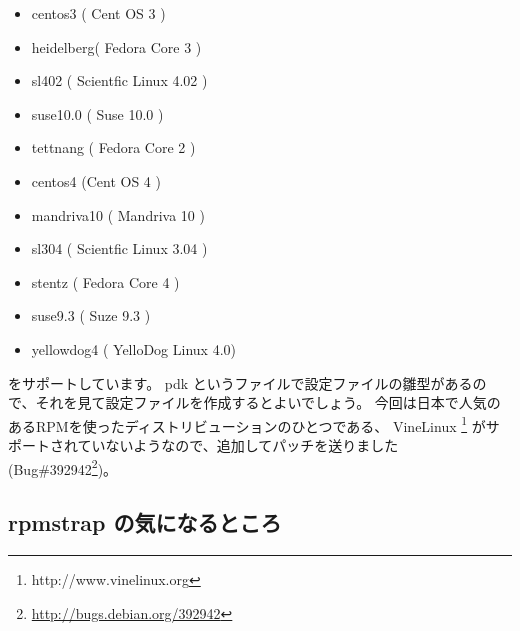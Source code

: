 \documentclass[mingoth,a4paper]{jsarticle}
\newcommand{\debianbug}[1]{Bug\##1\footnote{\url{http://bugs.debian.org/#1}}}
\begin{document}
\begin{itemize}
\item centos3 ( Cent OS 3 )
\item heidelberg( Fedora Core 3 )  
\item sl402 ( Scientfic Linux 4.02 )       
\item suse10.0  ( Suse 10.0 )
\item tettnang ( Fedora Core 2 )
\item centos4  (Cent OS 4 )   
\item mandriva10 ( Mandriva 10 )
\item sl304  ( Scientfic Linux 3.04 )    
\item stentz ( Fedora Core 4 )  
\item suse9.3  ( Suze 9.3 )   
\item yellowdog4 ( YelloDog Linux 4.0)
\end{itemize}

をサポートしています。
pdk というファイルで設定ファイルの雛型があるので、それを見て設定ファイルを作成するとよいでしょう。
今回は日本で人気のあるRPMを使ったディストリビューションのひとつである、 VineLinux \footnote{http://www.vinelinux.org} 
がサポートされていないようなので、追加してパッチを送りました (\debianbug{392942})。

\subsection{rpmstrap の気になるところ}
\end{document}
